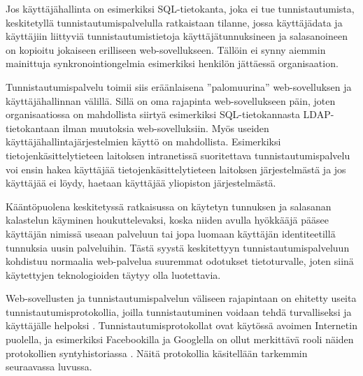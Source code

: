 Jos käyttäjähallinta on esimerkiksi SQL-tietokanta, joka ei tue tunnistautumista, keskitetyllä tunnistautumispalvelulla ratkaistaan tilanne, jossa käyttäjädata ja käyttäjiin liittyviä tunnistautumistietoja käyttäjätunnuksineen ja salasanoineen on kopioitu jokaiseen erilliseen web-sovellukseen. Tällöin ei synny aiemmin mainittuja synkronointiongelmia esimerkiksi henkilön jättäessä organisaation.

Tunnistautumispalvelu toimii siis eräänlaisena ''palomuurina'' web-sovelluksen ja käyttäjähallinnan välillä. Sillä on oma rajapinta web-sovellukseen päin, joten organisaatiossa on mahdollista siirtyä esimerkiksi SQL-tietokannasta LDAP-tietokantaan ilman muutoksia web-sovelluksiin. Myös useiden käyttäjähallintajärjestelmien käyttö on mahdollista. Esimerkiksi tietojenkäsittelytieteen laitoksen intranetissä suoritettava tunnistautumispalvelu voi ensin hakea käyttäjää tietojenkäsittelytieteen laitoksen järjestelmästä ja jos käyttäjää ei löydy, haetaan käyttäjää yliopiston järjestelmästä.

Kääntöpuolena keskitetyssä ratkaisussa on käytetyn tunnuksen ja salasanan kalastelun käyminen houkuttelevaksi, koska niiden avulla hyökkääjä pääsee käyttäjän nimissä useaan palveluun tai jopa luomaan käyttäjän identiteetillä tunnuksia uusin palveluihin. Tästä syystä keskitettyyn tunnistautumispalveluun kohdistuu normaalia web-palvelua suuremmat odotukset tietoturvalle, joten siinä käytettyjen teknologioiden täytyy olla luotettavia.

Web-sovellusten ja tunnistautumispalvelun väliseen rajapintaan on ehitetty useita tunnistautumisprotokollia, joilla tunnistautuminen voidaan tehdä turvalliseksi ja käyttäjälle helpoksi \cite{open_identity}. Tunnistautumisprotokollat ovat käytössä avoimen Internetin puolella, ja esimerkiksi Facebookilla ja Googlella on ollut merkittävä rooli näiden protokollien syntyhistoriassa \cite{open_identity}. Näitä protokollia käsitellään tarkemmin seuraavassa luvussa.
